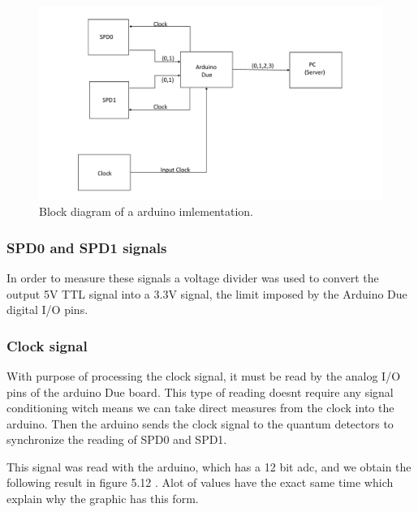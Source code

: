 \begin{refsection}
	\begin{figure}[H]
		\centering
		\includegraphics[width=0.8\linewidth]{./sdf/arduino_quantum_rx/figures/DiagramaGeralArduino.pdf}
		\caption{Block diagram of a arduino imlementation.}
		\label{fig:netxpto}
	\end{figure}
	

	\subsubsection{SPD0 and SPD1 signals}
	
	In order to measure these signals a voltage divider was used to convert the output 5V TTL signal into a 3.3V signal, the limit imposed by the Arduino Due digital I/O pins.
	
	\vspace{15px}
	\subsubsection{Clock signal}
	
	With purpose of processing the clock signal, it must be read by the analog I/O pins of the arduino Due board. This type of reading doesnt require any signal conditioning witch means we can take direct measures from the clock into the arduino. Then the arduino sends the clock signal to the quantum detectors to synchronize the reading of SPD0 and SPD1.
	
	\vspace{15px}
	
	This signal was read with the arduino, which has a 12 bit adc, and we obtain the following result in figure 5.12 . Alot of values have the exact same time which explain why the graphic has this form.
	

\end{refsection}
